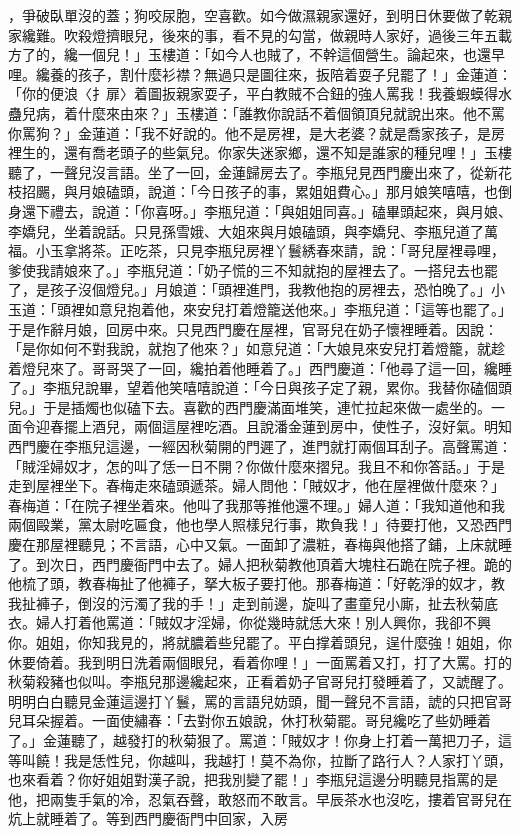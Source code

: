 \begin{showcontents}{}
，爭破臥單沒的蓋；狗咬尿胞，空喜歡。如今做濕親家還好，到明日休要做了乾親家纔難。吹殺燈擠眼兒，後來的事，看不見的勾當，做親時人家好，過後三年五載方了的，纔一個兒！」玉樓道：「如今人也賊了，不幹這個營生。論起來，也還早哩。纔養的孩子，割什麼衫襟？無過只是圖往來，扳陪着耍子兒罷了！」金蓮道：「你的便浪〈扌扉〉着圖扳親家耍子，平白教賊不合鈕的強人罵我！我養蝦蟆得水蠱兒病，着什麼來由來？」玉樓道：「誰教你說話不着個領頂兒就說出來。他不罵你罵狗？」金蓮道：「我不好說的。他不是房裡，是大老婆？就是喬家孩子，是房裡生的，還有喬老頭子的些氣兒。你家失迷家鄉，還不知是誰家的種兒哩！」玉樓聽了，一聲兒沒言語。坐了一回，金蓮歸房去了。李瓶兒見西門慶出來了，從新花枝招颺，與月娘磕頭，說道：「今日孩子的事，累姐姐費心。」那月娘笑嘻嘻，也倒身還下禮去，說道：「你喜呀。」李瓶兒道：「與姐姐同喜。」磕畢頭起來，與月娘、李嬌兒，坐着說話。只見孫雪娥、大姐來與月娘磕頭，與李嬌兒、李瓶兒道了萬福。小玉拿將茶。正吃茶，只見李瓶兒房裡丫鬟綉春來請，說：「哥兒屋裡尋哩，爹使我請娘來了。」李瓶兒道：「奶子慌的三不知就抱的屋裡去了。一搭兒去也罷了，是孩子沒個燈兒。」月娘道：「頭裡進門，我教他抱的房裡去，恐怕晚了。」小玉道：「頭裡如意兒抱着他，來安兒打着燈籠送他來。」李瓶兒道：「這等也罷了。」于是作辭月娘，回房中來。只見西門慶在屋裡，官哥兒在奶子懷裡睡着。因說：「是你如何不對我說，就抱了他來？」如意兒道：「大娘見來安兒打着燈籠，就趁着燈兒來了。哥哥哭了一回，纔拍着他睡着了。」西門慶道：「他尋了這一回，纔睡了。」李瓶兒說畢，望着他笑嘻嘻說道：「今日與孩子定了親，累你。我替你磕個頭兒。」于是插燭也似磕下去。喜歡的西門慶滿面堆笑，連忙拉起來做一處坐的。一面令迎春擺上酒兒，兩個這屋裡吃酒。且說潘金蓮到房中，使性子，沒好氣。明知西門慶在李瓶兒這邊，一經因秋菊開的門遲了，進門就打兩個耳刮子。高聲罵道：「賊淫婦奴才，怎的叫了恁一日不開？你做什麼來摺兒。我且不和你答話。」于是走到屋裡坐下。春梅走來磕頭遞茶。婦人問他：「賊奴才，他在屋裡做什麼來？」春梅道：「在院子裡坐着來。他叫了我那等推他還不理。」婦人道：「我知道他和我兩個毆業，黨太尉吃匾食，他也學人照樣兒行事，欺負我！」待要打他，又恐西門慶在那屋裡聽見；不言語，心中又氣。一面卸了濃粧，春梅與他搭了鋪，上床就睡了。到次日，西門慶衙門中去了。婦人把秋菊教他頂着大塊柱石跪在院子裡。跪的他梳了頭，教春梅扯了他褲子，拏大板子要打他。那春梅道：「好乾淨的奴才，教我扯褲子，倒沒的污濁了我的手！」走到前邊，旋叫了畫童兒小廝，扯去秋菊底衣。婦人打着他罵道：「賊奴才淫婦，你從幾時就恁大來！別人興你，我卻不興你。姐姐，你知我見的，將就膿着些兒罷了。平白撑着頭兒，逞什麼強！姐姐，你休要倚着。我到明日洗着兩個眼兒，看着你哩！」一面罵着又打，打了大罵。打的秋菊殺豬也似叫。李瓶兒那邊纔起來，正看着奶子官哥兒打發睡着了，又諕醒了。明明白白聽見金蓮這邊打丫鬟，罵的言語兒妨頭，聞一聲兒不言語，諕的只把官哥兒耳朵握着。一面使繡春：「去對你五娘說，休打秋菊罷。哥兒纔吃了些奶睡着了。」金蓮聽了，越發打的秋菊狠了。罵道：「賊奴才！你身上打着一萬把刀子，這等叫饒！我是恁性兒，你越叫，我越打！莫不為你，拉斷了路行人？人家打丫頭，也來看着？你好姐姐對漢子說，把我別變了罷！」李瓶兒這邊分明聽見指罵的是他，把兩隻手氣的冷，忍氣吞聲，敢怒而不敢言。早辰茶水也沒吃，摟着官哥兒在炕上就睡着了。等到西門慶衙門中回家，入房
\end{showcontents}
